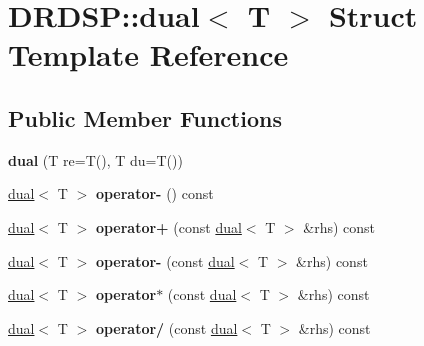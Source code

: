 \hypertarget{struct_d_r_d_s_p_1_1dual}{\section{D\-R\-D\-S\-P\-:\-:dual$<$ T $>$ Struct Template Reference}
\label{struct_d_r_d_s_p_1_1dual}
}
\subsection*{Public Member Functions}
\begin{DoxyCompactItemize}
\item 
\hypertarget{struct_d_r_d_s_p_1_1dual_a3392dca3e5dfdae64fd5b10b18087a87}{{\bfseries dual} (T re=T(), T du=T())}\label{struct_d_r_d_s_p_1_1dual_a3392dca3e5dfdae64fd5b10b18087a87}

\item 
\hypertarget{struct_d_r_d_s_p_1_1dual_a269257910dad7487cfe6b7f695585d39}{\hyperlink{struct_d_r_d_s_p_1_1dual}{dual}$<$ T $>$ {\bfseries operator-\/} () const }\label{struct_d_r_d_s_p_1_1dual_a269257910dad7487cfe6b7f695585d39}

\item 
\hypertarget{struct_d_r_d_s_p_1_1dual_ab18cda06a306a0bb97deabac1a8fd1ae}{\hyperlink{struct_d_r_d_s_p_1_1dual}{dual}$<$ T $>$ {\bfseries operator+} (const \hyperlink{struct_d_r_d_s_p_1_1dual}{dual}$<$ T $>$ \&rhs) const }\label{struct_d_r_d_s_p_1_1dual_ab18cda06a306a0bb97deabac1a8fd1ae}

\item 
\hypertarget{struct_d_r_d_s_p_1_1dual_a7f066ea6def9c0af3081a265543e402a}{\hyperlink{struct_d_r_d_s_p_1_1dual}{dual}$<$ T $>$ {\bfseries operator-\/} (const \hyperlink{struct_d_r_d_s_p_1_1dual}{dual}$<$ T $>$ \&rhs) const }\label{struct_d_r_d_s_p_1_1dual_a7f066ea6def9c0af3081a265543e402a}

\item 
\hypertarget{struct_d_r_d_s_p_1_1dual_a263a4cfe97ce6f8f272b28a9ad297c90}{\hyperlink{struct_d_r_d_s_p_1_1dual}{dual}$<$ T $>$ {\bfseries operator$\ast$} (const \hyperlink{struct_d_r_d_s_p_1_1dual}{dual}$<$ T $>$ \&rhs) const }\label{struct_d_r_d_s_p_1_1dual_a263a4cfe97ce6f8f272b28a9ad297c90}

\item 
\hypertarget{struct_d_r_d_s_p_1_1dual_ac838ce569f85fd920d587bfe22b4228c}{\hyperlink{struct_d_r_d_s_p_1_1dual}{dual}$<$ T $>$ {\bfseries operator/} (const \hyperlink{struct_d_r_d_s_p_1_1dual}{dual}$<$ T $>$ \&rhs) const }\label{struct_d_r_d_s_p_1_1dual_ac838ce569f85fd920d587bfe22b4228c}


\end{DoxyCompactItemize}
